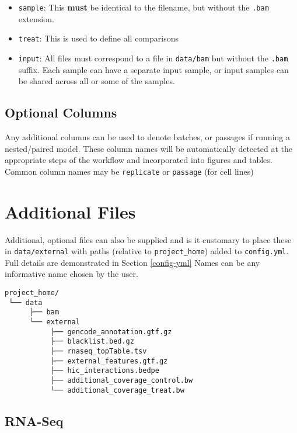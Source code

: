 \documentclass[
]{book}
\providecommand{\tightlist}{%
  \setlength{\itemsep}{0pt}\setlength{\parskip}{0pt}}
\begin{document}
\begin{itemize}
\tightlist
\item
  \texttt{sample}: This \textbf{must} be identical to the filename, but without the \texttt{.bam} extension.
\item
  \texttt{treat}: This is used to define all comparisons
\item
  \texttt{input}: All files must correspond to a file in \texttt{data/bam} but without the \texttt{.bam} suffix. Each sample can have a separate input sample, or input samples can be shared across all or some of the samples.
\end{itemize}

\hypertarget{optional-columns}{%
\subsection{Optional Columns}\label{optional-columns}}

Any additional columns can be used to denote batches, or passages if running a nested/paired model.
These column names will be automatically detected at the appropriate steps of the workflow and incorporated into figures and tables.
Common column names may be \texttt{replicate} or \texttt{passage} (for cell lines)

\hypertarget{additional-files}{%
\section{Additional Files}\label{additional-files}}

Additional, optional files can also be supplied and is it customary to place these in \texttt{data/external} with paths (relative to \texttt{project\_home}) added to \texttt{config.yml}.
Full details are demonstrated in Section \ref{config-yml}
Names can be any informative name chosen by the user.

\begin{verbatim}
project_home/
 └── data
      ├── bam 
      └── external
           ├── gencode_annotation.gtf.gz
           ├── blacklist.bed.gz
           ├── rnaseq_topTable.tsv
           ├── external_features.gtf.gz
           ├── hic_interactions.bedpe
           ├── additional_coverage_control.bw
           └── additional_coverage_treat.bw
\end{verbatim}

\hypertarget{rna-seq}{%
\subsection{RNA-Seq}\label{rna-seq}}
\end{document}
